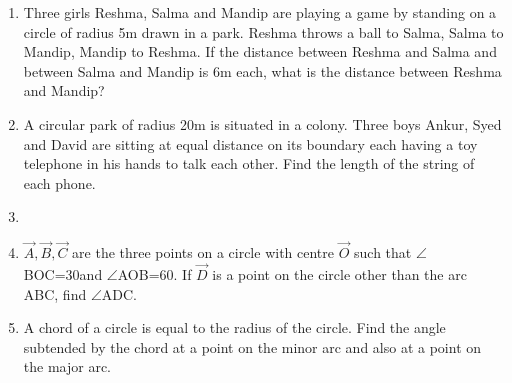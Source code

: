 \begin{enumerate}[label=\thesection.\arabic*,ref=\thesection.\theenumi]
\begin{figure}[!ht]
    \caption{}
    \label{fig:chapters/9/10/41}
\end{figure}
\item Three girls Reshma, Salma and Mandip are playing a game by standing on 
a circle of radius 5m drawn in a park. Reshma throws a ball to Salma, Salma to 
Mandip, Mandip to Reshma. If the distance between Reshma and Salma and between 
Salma and Mandip is 6m each, what is the distance between Reshma and Mandip?
\\
\solution 

\item A circular park of radius 20m is situated in a colony. Three boys Ankur,
Syed and David are sitting at equal distance on its boundary each having a toy 
telephone in his hands to talk each other. Find the length of the string of each 
phone.
\item 
\label{chapters/9/10/4/6}

\item  $\vec{A},\vec{B},\vec{C}$ are the three points on a circle with centre $\vec{O}$ such that $\angle$BOC=30\degree and $\angle$AOB=60\degree. If $\vec{D}$ is a point on the circle other than the arc ABC, find $\angle$ADC.
\label{chapters/9/10/5/1}
\\
\solution

\item A chord of a circle is equal to the radius of the circle. Find the angle subtended by the chord at a point on the minor arc and also at a point on the major arc.
\label{chapters/9/10/5/2}
\\
\solution



\end{enumerate}
